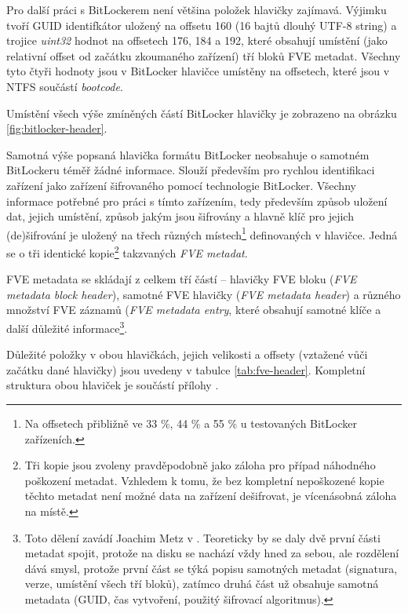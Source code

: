 Pro další práci s BitLockerem není většina položek hlavičky zajímavá. Výjimku tvoří GUID identifkátor uložený na offsetu 160 (16 bajtů dlouhý UTF-8 string) a trojice \emph{uint32} hodnot na offsetech 176, 184 a 192, které obsahují umístění (jako relativní offset od začátku zkoumaného zařízení) tří bloků FVE metadat. Všechny tyto čtyři hodnoty jsou v BitLocker hlavičce umístěny na offsetech, které jsou v NTFS součástí \emph{bootcode}.

Umístění všech výše zmíněných  částí BitLocker hlavičky je zobrazeno na obrázku \ref{fig:bitlocker-header}.


\label{sec:fve-metadata}

Samotná výše popsaná hlavička formátu BitLocker neobsahuje o samotném BitLockeru téměř žádné informace. Slouží především pro rychlou identifikaci zařízení jako zařízení šifrovaného pomocí technologie BitLocker. Všechny informace potřebné pro práci s tímto zařízením, tedy především způsob uložení dat, jejich umístění, způsob jakým jsou šifrovány a hlavně klíč pro jejich (de)šifrování je uložený na třech různých místech\footnote{Na offsetech přibližně ve 33 \%, 44 \% a 55 \% u testovaných BitLocker zařízeních.} definovaných v hlavičce. Jedná se o tři identické kopie\footnote{Tři kopie jsou zvoleny pravděpodobně jako záloha pro případ náhodného poškození metadat. Vzhledem k tomu, že bez kompletní nepoškozené kopie těchto metadat není možné data na zařízení dešifrovat, je vícenásobná záloha na místě.} takzvaných \emph{FVE metadat}.

FVE metadata se skládají z celkem tří částí -- hlavičky FVE bloku (\emph{FVE metadata block header}), samotné FVE hlavičky (\emph{FVE metadata header}) a různého množství FVE záznamů (\emph{FVE metadata entry}, které obsahují samotné klíče a další důležité informace\cite{Metz2011}\footnote{Toto dělení zavádí Joachim Metz v \cite{Metz2011}. Teoreticky by se daly dvě první části metadat spojit, protože na disku se nachází vždy hned za sebou, ale rozdělení dává smysl, protože první část se týká popisu samotných metadat (signatura, verze, umístění všech tří bloků), zatímco druhá část už obsahuje samotná metadata (GUID, čas vytvoření, použitý šifrovací algoritmus).}.

Důležité položky v obou hlavičkách, jejich velikosti a offsety (vztažené vůči začátku dané hlavičky) jsou uvedeny v tabulce \ref{tab:fve-header}. Kompletní struktura obou hlaviček je součástí přílohy .

